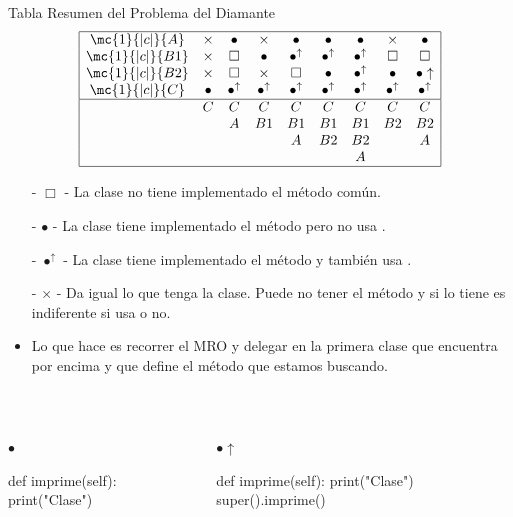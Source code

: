 \documentclass[10pt,envcountsect,spanish]{beamer}
\begin{document}
\begin{frame}[fragile]{Tabla Resumen del Problema del Diamante}
\footnotesize
$$
\begin{array}{|ccccccccc|} \hline
\mc{1}{|c|}{A}  & \times  & \bullet         & \times          & \bullet           & \bullet         & \bullet         & \times      & \bullet     \\
\mc{1}{|c|}{B1} & \times  & \Box            & \bullet         & \bullet^\uparrow  & \bullet^\uparrow & \bullet^\uparrow & \Box        & \Box        \\
\mc{1}{|c|}{B2} & \times  & \Box            & \times          & \Box              & \bullet & \bullet^\uparrow & \bullet     & \bullet\uparrow \\
\mc{1}{|c|}{C}  & \bullet & \bullet^\uparrow & \bullet^\uparrow & \bullet^\uparrow& \bullet^\uparrow & \bullet^\uparrow & \bullet^\uparrow & \bullet^\uparrow \\ \hline
   & C   & C  & C   & C  & C  & C  & C  & C  \\
   &     & A  & B1  & B1 & B1 & B1 & B2 & B2      \\
   &     &    &     & A  & B2 & B2      &    & A  \\
   &     &    &     &    &    & A  &    &    \\ \hline
\end{array}
$$
\small
\begin{itemize}
\item[-] $\Box$ - La clase no tiene implementado el método común.
\item[-] $\bullet$ - La clase tiene implementado el método pero no usa .
\item[-] $\bullet^\uparrow$ - La clase tiene implementado el método y también usa .
\item[-] $\times$ - Da igual lo que tenga la clase. Puede no tener el método y si lo tiene es indiferente si usa  o no.
\item Lo que  hace es recorrer el MRO y
delegar en la primera clase que encuentra por encima y que define el método que estamos buscando.
\end{itemize}

\unEjemplo \\ \vspace{-0.5cm} \footnotesize
\begin{columns}
\begin{column}{.4\textwidth}
$\bullet$
\begin{pyverbatim}[][frame=single]
def imprime(self):
   print("Clase")
\end{pyverbatim}   
\end{column}
\begin{column}{.4\textwidth}
$\bullet\uparrow$
\begin{pyverbatim}[][frame=single]
def imprime(self):
   print("Clase")
   super().imprime()
\end{pyverbatim} 
\end{column}
\end{columns}
\end{frame}
\end{document}
